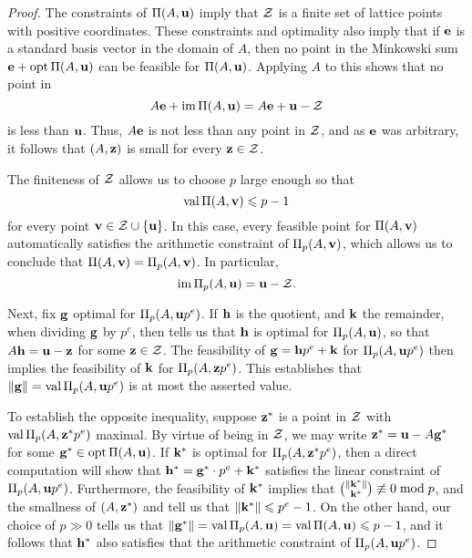 \documentclass[11pt]{amsart}
\begin{document}
\begin{proof}  The constraints of $\Pi(A, \mathbf{u})$ imply that $\mathcal{Z}$ is a finite set of lattice points with positive coordinates.   These constraints and optimality also imply that if $\mathbf{e}$ is a standard basis vector in the domain of $A$, then no point in the Minkowski sum $\mathbf{e} + \operatorname{opt} \Pi(A, \mathbf{u})$ can be feasible for $\Pi(A, \mathbf{u})$.  Applying $A$ to this shows that no point in 
\[ A \mathbf{e} + \operatorname{im} \Pi(A, \mathbf{u}) = A \mathbf{e} + \mathbf{u} - \mathcal{Z} \] 
is less than $\mathbf{u}$.  Thus, $A \mathbf{e}$ is not less than any point in $\mathcal{Z}$, and as $\mathbf{e}$ was arbitrary, it follows that $(A, \mathbf{z})$ is small for every $\mathbf{z} \in \mathcal{Z}$.

The finiteness of $\mathcal{Z}$ allows us to choose $p$ large enough so that \[ \operatorname{val} \Pi(A, \mathbf{v}) \leqslant p -1 \] for every point $\mathbf{v} \in \mathcal{Z} \cup \{ \mathbf{u} \}$.  In this case, every feasible point for $\Pi(A, \mathbf{v})$  automatically satisfies the arithmetic constraint of $\Pi_p(A, \mathbf{v})$, which allows us to conclude that $\Pi(A, \mathbf{v}) = \Pi_p(A, \mathbf{v})$.  In particular, \[ \operatorname{im} \Pi_p(A, \mathbf{u}) =\mathbf{u} - \mathcal{Z}. \] 

Next, fix $\mathbf{g}$ optimal for $\Pi_p(A, \mathbf{u}p^e)$.  If $\mathbf{h}$ is the quotient, and $\mathbf{k}$ the remainder, when dividing $\mathbf{g}$ by $p^e$, then  tells us that $\mathbf{h}$ is optimal for $\Pi_p(A, \mathbf{u})$, so that $A \mathbf{h} = \mathbf{u}-\mathbf{z}$ for some $\mathbf{z} \in \mathcal{Z}$.  The feasibility of $\mathbf{g}=\mathbf{h}p^e + \mathbf{k}$ for $\Pi_p(A, \mathbf{u}p^e)$ then implies the feasibility of $\mathbf{k}$ for $\Pi_p(A, \mathbf{z}p^e)$.  This establishes that $\| \mathbf{g} \| = \operatorname{val} \Pi_p(A, \mathbf{u}p^e)$ is at most the asserted value.

To establish the opposite inequality, suppose $\mathbf{z}^{\ast}$ is a point in $\mathcal{Z}$ with $\operatorname{val} \Pi_p(A, \mathbf{z}^{\ast} p^e)$ maximal.  By virtue of being in $\mathcal{Z}$, we may write $\mathbf{z}^{\ast} = \mathbf{u} - A \mathbf{g}^{\ast}$ for some $\mathbf{g}^{\ast} \in \operatorname{opt} \Pi(A, \mathbf{u})$.  If $\mathbf{k}^{\ast}$ is optimal for $\Pi_p(A, \mathbf{z}^{\ast} p^e)$, then a direct computation will show that 
$\mathbf{h}^{\ast} = \mathbf{g}^{\ast} \cdot p^e + \mathbf{k}^{\ast}$ satisfies the linear constraint of  $\Pi_p(A, \mathbf{u}p^e)$.  Furthermore, the feasibility of $\mathbf{k}^{\ast}$ implies that $\binom{\| \mathbf{k}^{\ast} \|}{\mathbf{k}^{\ast}} \not \equiv 0 \bmod p$, and the smallness of $(A, \mathbf{z}^{\ast})$ and  tell us that $\| \mathbf{k}^{\ast} \| \leqslant p^e-1$.  On the other hand, our choice of $p \gg 0$ tells us that $\| \mathbf{g}^{\ast} \| = \operatorname{val} \Pi_p(A, \mathbf{u}) = \operatorname{val} \Pi(A, \mathbf{u}) \leqslant p-1$, and it follows that $\mathbf{h}^{\ast}$ also satisfies that the arithmetic constraint of $\Pi_p(A, \mathbf{u}p^e)$.
\end{proof}
\end{document}

